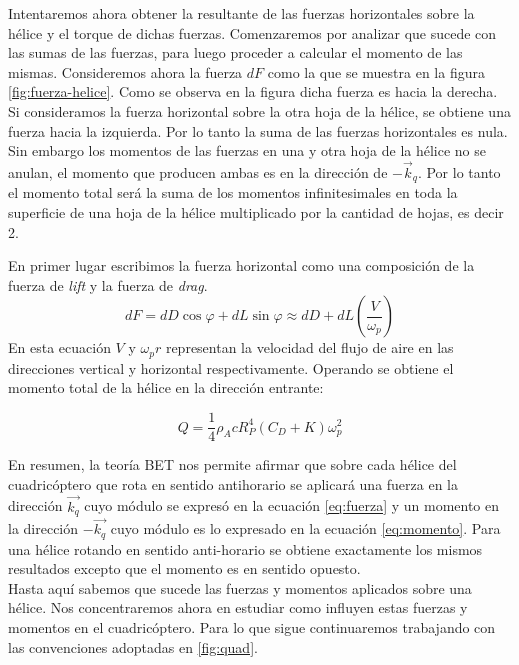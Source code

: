 \documentclass[main]{subfiles}
\begin{document}
Intentaremos ahora obtener la resultante de las fuerzas horizontales sobre la h\'elice y el torque de dichas fuerzas. Comenzaremos por analizar que sucede con las sumas de las fuerzas, para luego proceder a calcular el momento de las mismas. Consideremos ahora la fuerza $dF$ como la que se muestra en la figura \ref{fig:fuerza-helice}. Como se observa en la figura dicha fuerza es hacia la derecha. Si consideramos la fuerza horizontal sobre la otra hoja de la h\'elice, se obtiene una fuerza hacia la izquierda. Por lo tanto la suma de las fuerzas horizontales es nula. Sin embargo los momentos de las fuerzas en una y otra hoja de la h\'elice no se anulan, el momento que producen ambas es en la direcci\'on de $-\vec{k}_q$. Por lo tanto el momento total ser\'a la suma de los momentos infinitesimales en toda la superficie de una hoja de la h\'elice multiplicado por la cantidad de hojas, es decir 2. 

En primer lugar escribimos la fuerza horizontal como una composici\'on de la fuerza de \emph{lift} y la fuerza de \emph{drag}. 
\begin{equation}
dF=dD\cos\varphi+dL\sin\varphi \approx dD +dL\left(\frac{V}{\omega_p}\right)
\end{equation} 
En esta ecuaci\'on $V$ y $\omega_p r$ representan la velocidad del flujo de aire en las direcciones vertical y horizontal respectivamente. Operando se obtiene el momento total de la h\'elice en la direcci\'on entrante:

\begin{equation}
\label{eq:momento}
Q=\frac{1}{4}\rho_A c R_P^4(C_D+K)\omega_p^2
\end{equation}

 

En resumen, la teor\'ia BET nos permite afirmar que sobre cada h\'elice del cuadric\'optero que rota en sentido antihorario se aplicar\'a una fuerza en la direcci\'on $\vec{k_q}$ cuyo m\'odulo se expres\'o en la ecuaci\'on \ref{eq:fuerza} y un momento en la direcci\'on $-\vec{k_q}$ cuyo m\'odulo es lo expresado en la ecuaci\'on \ref{eq:momento}. Para una h\'elice rotando en sentido anti-horario se obtiene exactamente los mismos resultados excepto que el momento es en sentido opuesto.\\

Hasta aqu\'i sabemos que sucede las fuerzas y momentos aplicados sobre una h\'elice. Nos concentraremos ahora en estudiar como influyen estas fuerzas y momentos en el cuadric\'optero. Para lo que sigue continuaremos trabajando con las convenciones adoptadas en \ref{fig:quad}. 
 
\end{document}
